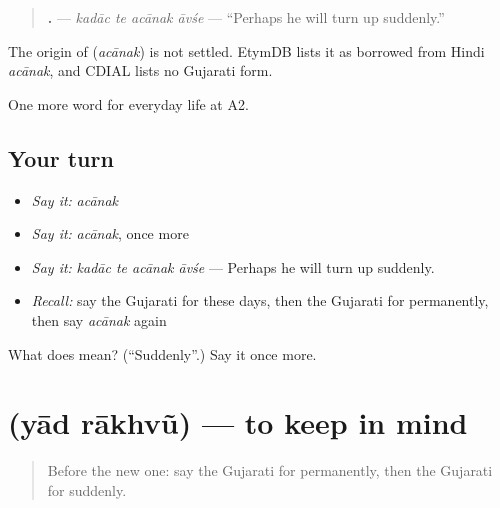 \begin{quote}
\textbf{   .} — \emph{kadāc te acānak āvśe} — \textquotedblleft{}Perhaps he will turn up suddenly.\textquotedblright{}
\end{quote}

\begin{cousinweb}
The origin of \textbf{} (\emph{acānak}) is not settled. EtymDB lists it as borrowed from Hindi \emph{acānak}, and CDIAL lists no Gujarati form.
\end{cousinweb}

\begin{grammarlens}[title={What you've built}]
One more word for everyday life at A2.
\end{grammarlens}

\subsection*{Your turn}
\begin{itemize}
\raggedright
  \item \emph{Say it:} \emph{acānak}
  \item \emph{Say it:} \emph{acānak}, once more
  \item \emph{Say it:} \emph{kadāc te acānak āvśe} — Perhaps he will turn up suddenly.
  \item \emph{Recall:} say the Gujarati for these days, then the Gujarati for permanently, then say \emph{acānak} again
\end{itemize}

\begin{tcolorbox}[breakable,colback=teal!4,colframe=teal!35!black,title={Before you move on}]
What does  mean? (\textquotedblleft{}Suddenly\textquotedblright{}.) Say it once more.
\end{tcolorbox}
\section[\texorpdfstring{\gu{યાદ} \gu{રાખવું} (yād rākhvũ)}{યાદ રાખવું (yād rākhvũ)}]{  (yād rākhvũ) — to keep in mind}

\label{lesson:GU-C182-yad-rakhvu}



\begin{quote}
Before the new one: say the Gujarati for permanently, then the Gujarati for suddenly.
\end{quote}

